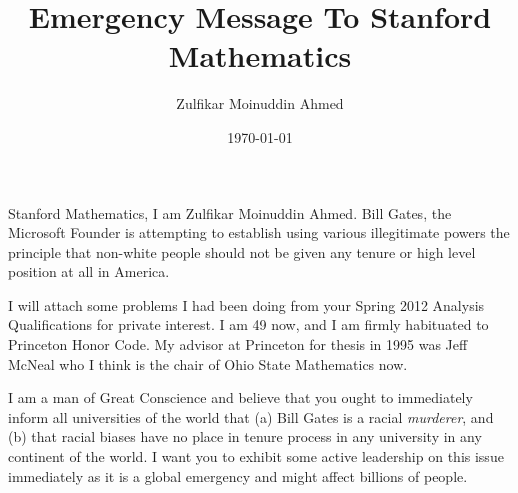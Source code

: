 \documentclass{amsart}
\title{Emergency Message To Stanford Mathematics}
\author{Zulfikar Moinuddin Ahmed}
\date{\today}
\begin{document}
\maketitle

Stanford Mathematics, I am Zulfikar Moinuddin Ahmed.  Bill Gates, the Microsoft Founder is attempting to establish using various illegitimate powers the principle that non-white people should not be given any tenure or high level position at all in America.  

I will attach some problems I had been doing from your Spring 2012 Analysis Qualifications for private interest.  I am 49 now, and I am firmly habituated to Princeton Honor Code.  My advisor at Princeton for thesis in 1995 was Jeff McNeal who I think is the chair of Ohio State Mathematics now.

I am a man of Great Conscience and believe that you ought to immediately inform all universities of the world that (a) Bill Gates is a racial {\em murderer}, and (b) that racial biases have no place in tenure process in any university in any continent of the world. I want you to exhibit some active leadership on this issue immediately as it is a global emergency and might affect billions of people.
\end{document}

